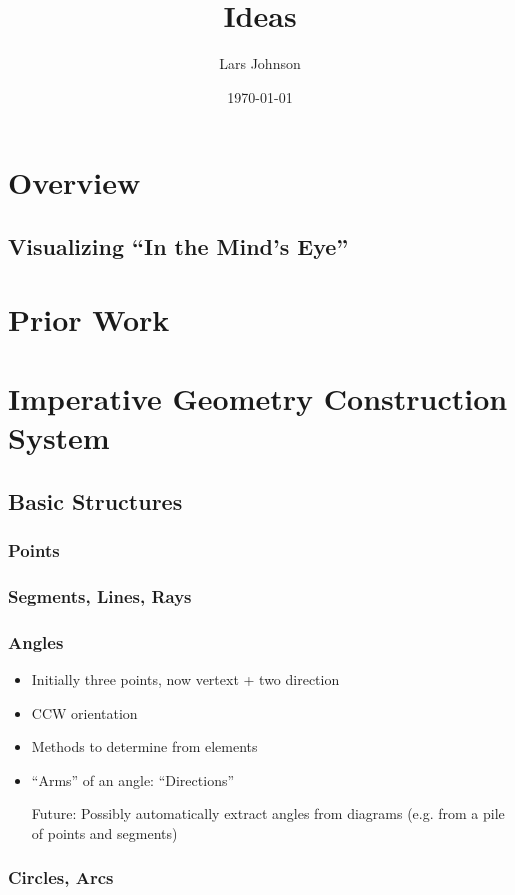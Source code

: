 \documentclass[11pt]{article}
\title{Ideas}
\author{Lars Johnson}
\date{\today}
\begin{document}
\maketitle

\section{Overview}
\label{sec-1}
\subsection{Visualizing ``In the Mind's Eye''}
\label{sec-1-1}
\section{Prior Work}
\label{sec-2}
\section{Imperative Geometry Construction System}
\label{sec-3}
\subsection{Basic Structures}
\label{sec-3-1}
\subsubsection{Points}
\label{sec-3-1-1}
\subsubsection{Segments, Lines, Rays}
\label{sec-3-1-2}
\subsubsection{Angles}
\label{sec-3-1-3}

\begin{itemize}
\item Initially three points, now vertext + two direction
\item CCW orientation
\item Methods to determine from elements
\item ``Arms'' of an angle: ``Directions''
\item[Future:] Possibly automatically extract angles from diagrams
      (e.g. from a pile of points and segments)
\end{itemize}
\subsubsection{Circles, Arcs}
\label{sec-3-1-4}
\end{document}
